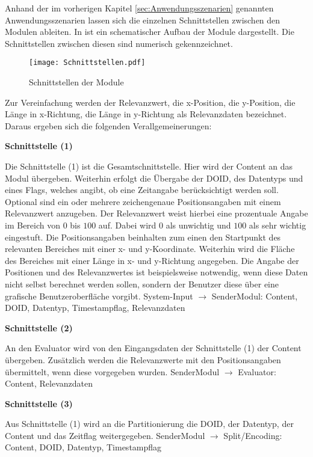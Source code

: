Anhand der im vorherigen Kapitel \ref{sec:Anwendungsszenarien} genannten
Anwendungsszenarien lassen sich die einzelnen Schnittstellen zwischen den
Modulen ableiten. In  ist ein schematischer Aufbau
der Module dargestellt. Die Schnittstellen zwischen diesen sind numerisch
gekennzeichnet.

\begin{figure}[H]
\centering
\texttt{[image: Schnittstellen.pdf]}
\caption{Schnittstellen der Module}
\label{fig:Schnittstellen}
\end{figure}

Zur Vereinfachung werden der Relevanzwert, die x-Position, die
y-Position, die Länge in x-Richtung, die Länge in y-Richtung als Relevanzdaten
bezeichnet. Daraus ergeben sich die folgenden Verallgemeinerungen:

\textbf{Schnittstelle (1)}

Die Schnittstelle (1) ist die Gesamtschnittstelle. Hier wird der
Content an das Modul übergeben. Weiterhin erfolgt die Übergabe der \gls{DOID}, des
Datentyps und eines Flags, welches angibt, ob eine Zeitangabe berücksichtigt
werden soll.
Optional sind ein oder mehrere zeichengenaue Positionsangaben mit einem
Relevanzwert anzugeben. Der Relevanzwert weist hierbei eine
prozentuale Angabe im Bereich von $0$ bis $100$ auf. Dabei wird $0$ als
unwichtig und $100$ als sehr wichtig eingestuft. Die Positionsangaben beinhalten
zum einen den Startpunkt des relevanten Bereiches mit einer x- und y-Koordinate. Weiterhin
wird die Fläche des Bereiches mit einer Länge in x- und y-Richtung angegeben.
Die Angabe der Positionen und des Relevanzwertes ist beispielsweise notwendig,
wenn diese Daten nicht selbst berechnet werden sollen, sondern der Benutzer
diese über eine grafische Benutzeroberfläche vorgibt.\newline
System-Input $\rightarrow$ SenderModul: Content, \gls{DOID}, Datentyp,
Timestampflag, Relevanzdaten

\textbf{Schnittstelle (2)}

An den Evaluator wird von den Eingangsdaten der Schnittstelle (1)
der Content übergeben. Zusätzlich werden die Relevanzwerte mit den
Positionsangaben übermittelt, wenn diese vorgegeben wurden.\newline
SenderModul $\rightarrow$ Evaluator: Content, Relevanzdaten  

\textbf{Schnittstelle (3)}

Aus Schnittstelle (1) wird an die Partitionierung
die \gls{DOID}, der Datentyp, der Content und das Zeitflag
weitergegeben.\newline
SenderModul $\rightarrow$ Split/Encoding: Content, \gls{DOID}, Datentyp,
Timestampflag

